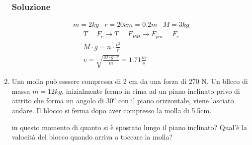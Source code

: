 \documentclass{report}
\begin{document}
\begin{enumerate}
\subsubsection{Soluzione}
\label{sec:sol10}
\begin{eqnarray*}
  m=2kg & r=20cm =0.2m & M=3kg
\end{eqnarray*}
\begin{eqnarray*}
  T=F_c\to T=F_{PM}\to F_{pm}=F_c\\
  M\cdot g=n\cdot \frac{v^2}{r}\\
  v=\sqrt{\frac{M\cdot g\cdot r}{m}}=1.71\frac{m}{s}
\end{eqnarray*}
\item Una molla può esssere compressa di 2 cm da una forza di 270 N. Un bllcco di massa $m=12kg$, inizialmente fermo in cima ad un piano inclinato privo di attrito che forma un angolo di $30^o$ con il piano orizzontale, viene lasciato andare. Il blocco si ferma dopo aver compresso la molla di 5.5cm.
  \begin{tasks}
    \task in questo momento di quanto si è spostato lungo il piano inclinato?
    \task Qual'è la valocità del blocco quando arriva a toccare la molla?
  \end{tasks}
  

\end{enumerate}
\end{document}
